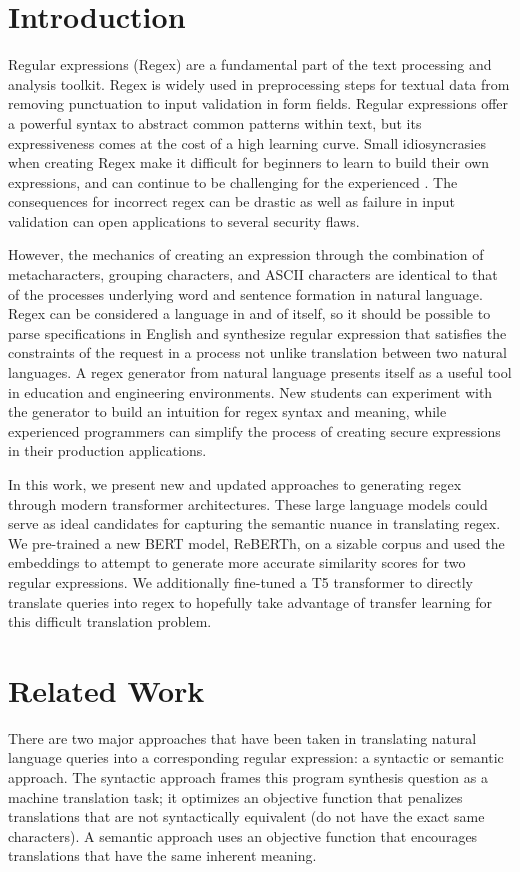 \documentclass[11pt,a4paper]{article}
\begin{document}
\section{Introduction}

Regular expressions (Regex) are a fundamental part of the text processing and analysis toolkit. Regex is widely used in preprocessing steps for textual data from removing punctuation to input validation in form fields. Regular expressions offer a powerful syntax to abstract common patterns within text, but its expressiveness comes at the cost of a high learning curve. Small idiosyncrasies when creating Regex make it difficult for beginners to learn to build their own expressions, and can continue to be challenging for the experienced \cite{Friedl:02}. The consequences for incorrect regex can be drastic as well as failure in input validation can open applications to several security flaws. 

However, the mechanics of creating an expression through the combination of metacharacters, grouping characters, and ASCII characters are identical to that of the processes underlying word and sentence formation in natural language. Regex can be considered a language in and of itself, so it should be possible to parse specifications in English and synthesize regular expression that satisfies the constraints of the request in a process not unlike translation between two natural languages. A regex generator from natural language presents itself as a useful tool in education and engineering environments. New students can experiment with the generator to build an intuition for regex syntax and meaning, while experienced programmers can simplify the process of creating secure expressions in their production applications. 

In this work, we present new and updated approaches to generating regex through modern transformer architectures. These large language models could serve as ideal candidates for capturing the semantic nuance in translating regex. We pre-trained a new BERT model, ReBERTh, on a sizable corpus and used the embeddings to attempt to generate more accurate similarity scores for two regular expressions. We additionally fine-tuned a T5 transformer to directly translate queries into regex to hopefully take advantage of transfer learning for this difficult translation problem.

\section{Related Work}
There are two major approaches that have been taken in translating natural language queries into a corresponding regular expression: a syntactic or semantic approach. The syntactic approach frames this program synthesis question as a machine translation task; it optimizes an objective function that penalizes translations that are not syntactically equivalent (do not have the exact same characters). A semantic approach uses an objective function that encourages translations that have the same inherent meaning.
\end{document}
